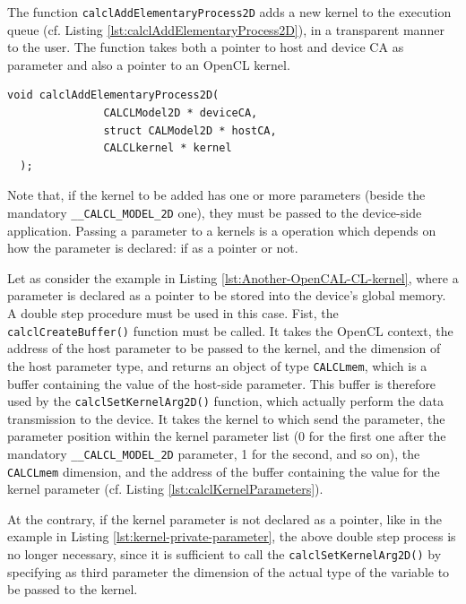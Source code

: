 The function \verb'calclAddElementaryProcess2D' adds a new kernel to
the execution queue (cf. Listing
\ref{lst:calclAddElementaryProcess2D}), in a transparent manner to the
user. The function takes both a pointer to host and device CA as
parameter and also a pointer to an OpenCL kernel.

\begin{lstlisting}[float,floatplacement=TH, label=lst:calclAddElementaryProcess2D, caption=The calclAddElementaryProcess2D function., numbers=none]
  void calclAddElementaryProcess2D(
               CALCLModel2D * deviceCA,
               struct CALModel2D * hostCA,
               CALCLkernel * kernel
  );
\end{lstlisting}

Note that, if the kernel to be added has one or more parameters
(beside the mandatory \verb'__CALCL_MODEL_2D' one), they must be
passed to the device-side application. Passing a parameter to a
kernels is a operation which depends on how the parameter is declared:
if as a pointer or not.

Let as consider the example in Listing
\ref{lst:Another-OpenCAL-CL-kernel}, where a parameter is declared as
a pointer to be stored into the device's global memory. A double step
procedure must be used in this case. Fist, the
\verb'calclCreateBuffer()' function must be called. It takes the
OpenCL context, the address of the host parameter to be passed to the
kernel, and the dimension of the host parameter type, and returns an
object of type \verb'CALCLmem', which is a buffer containing the value
of the host-side parameter. This buffer is therefore used by the
\verb'calclSetKernelArg2D()' function, which actually perform the data
transmission to the device. It takes the kernel to which send the
parameter, the parameter position within the kernel parameter list (0
for the first one after the mandatory \verb'__CALCL_MODEL_2D'
parameter, 1 for the second, and so on), the \verb'CALCLmem'
dimension, and the address of the buffer containing the value for the
kernel parameter (cf. Listing \ref{lst:calclKernelParameters}).

At the contrary, if the kernel parameter is not declared as a pointer,
like in the example in Listing \ref{lst:kernel-private-parameter}, the
above double step process is no longer necessary, since it is
sufficient to call the \verb'calclSetKernelArg2D()' by specifying as
third parameter the dimension of the actual type of the variable to be
passed to the kernel. 


